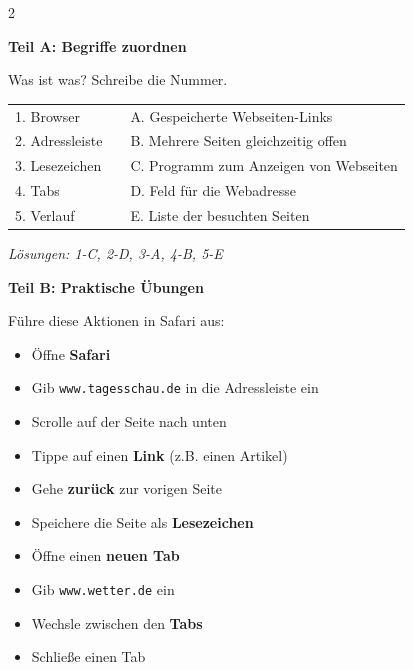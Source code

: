 \documentclass[a4paper,landscape,8pt]{extarticle}
\begin{document}
\begin{multicols}{2}

\textbf{\large Teil A: Begriffe zuordnen}

Was ist was? Schreibe die Nummer.

\vspace{2mm}

\renewcommand{\arraystretch}{1.5}
\begin{tabular}{@{}p{3cm}p{0.8cm}p{5cm}@{}}
1. Browser & & A. Gespeicherte Webseiten-Links \\
2. Adressleiste & & B. Mehrere Seiten gleichzeitig offen \\
3. Lesezeichen & & C. Programm zum Anzeigen von Webseiten \\
4. Tabs & & D. Feld für die Webadresse \\
5. Verlauf & & E. Liste der besuchten Seiten \\
\end{tabular}
\renewcommand{\arraystretch}{1}

\textit{\footnotesize Lösungen: 1-C, 2-D, 3-A, 4-B, 5-E}

\vspace{4mm}

\textbf{\large Teil B: Praktische Übungen}

Führe diese Aktionen in Safari aus:

\vspace{2mm}

\begin{itemize}[label=$\square$, itemsep=3pt]
\item Öffne \textbf{Safari}
\item Gib \texttt{www.tagesschau.de} in die Adressleiste ein
\item Scrolle auf der Seite nach unten
\item Tippe auf einen \textbf{Link} (z.B. einen Artikel)
\item Gehe \textbf{zurück} zur vorigen Seite
\item Speichere die Seite als \textbf{Lesezeichen}
\item Öffne einen \textbf{neuen Tab}
\item Gib \texttt{www.wetter.de} ein
\item Wechsle zwischen den \textbf{Tabs}
\item Schließe einen Tab
\end{itemize}

\vspace{4mm}


\end{multicols}
\end{document}
